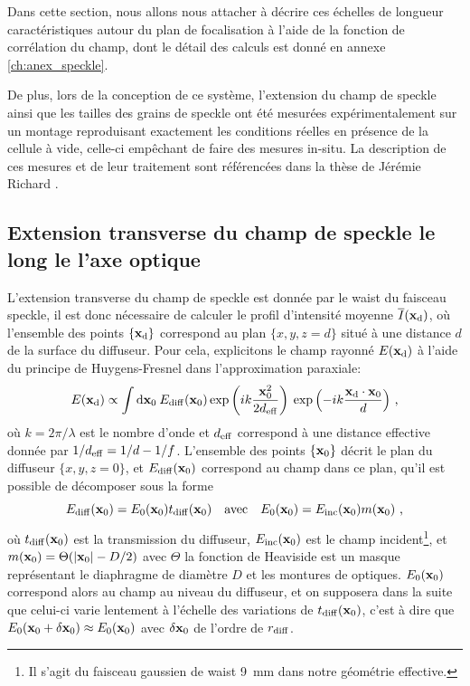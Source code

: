Dans cette section, nous allons nous attacher à décrire ces échelles de longueur caractéristiques autour du plan de focalisation à l'aide de la fonction de corrélation du champ, dont le détail des calculs est donné en annexe \ref{ch:anex_speckle}. 

De plus, lors de la conception de ce système, l'extension du champ de speckle ainsi que les tailles des grains de speckle ont été mesurées expérimentalement sur un montage reproduisant exactement les conditions réelles en présence de la cellule à vide, celle-ci empêchant de faire des mesures in-situ. La description de ces mesures et de leur traitement sont référencées dans la thèse de Jérémie Richard \citep{richard2015propagation}.




\subsection{Extension transverse du champ de speckle le long le l'axe optique}
L'extension transverse du champ de speckle est donnée par le waist du faisceau speckle, il est donc nécessaire de calculer le profil d'intensité moyenne $\overline{I}(\mathbf{x}_{\mathrm{d}})$, où l'ensemble des points $\lbrace\mathbf{x}_{\mathrm{d}}\rbrace$ correspond au plan $\lbrace x,y,z=d \rbrace$ situé à une distance $d$ de la surface du diffuseur. Pour cela, explicitons le champ rayonné $E(\mathbf{x}_{\mathrm{d}})$ à l'aide du principe de Huygens-Fresnel dans l'approximation paraxiale:
\begin{equation}
E(\mathbf{x}_{\mathrm{d}}) \propto \int{\mathrm{d}\mathbf{x}_0\: E_{\mathrm{diff}}(\mathbf{x}_0) \exp{\left( ik\frac{\mathbf{x}_0^2}{2d_{\mathrm{eff}}} \right) } \: \exp{\left( -ik \frac{\mathbf{x}_{\mathrm{d}}\cdot \mathbf{x}_0}{d} \right) } } \text{ ,}
\label{eq:amplitude_rayonnee}
\end{equation}
où $k=2\pi/\lambda$ est le nombre d'onde et $d_{\mathrm{eff}}$ correspond à une distance effective donnée par $1/d_{\mathrm{eff}}=1/d-1/f$. L'ensemble des points $\lbrace\mathbf{x}_0\rbrace$ décrit le plan du diffuseur $\lbrace x,y,z=0 \rbrace$, et $E_{\mathrm{diff}} (\mathbf{x}_0)$ correspond au champ dans ce plan, qu'il est possible de décomposer sous la forme 
\begin{equation}
E_{\mathrm{diff}}(\mathbf{x}_0)=E_0(\mathbf{x}_0) t_{\mathrm{diff}}(\mathbf{x}_0) \quad \text{avec} \quad E_0(\mathbf{x}_0) = E_\mathrm{inc} (\mathbf{x}_0) m(\mathbf{x}_0) \text{ ,}
\end{equation}
où $t_{\mathrm{diff}}(\mathbf{x}_0)$ est la transmission du diffuseur, $E_{\mathrm{inc}}(\mathbf{x}_0)$ est le champ incident\footnote{Il s'agit du faisceau gaussien de waist \SI{9}{\milli\metre} dans notre géométrie effective.}, et $m(\mathbf{x}_0)=\Theta(\left| \mathbf{x}_0 \right| - D/2)$ avec $\Theta$ la fonction de Heaviside est un masque représentant le diaphragme de diamètre $D$ et les montures de optiques. $E_0(\mathbf{x}_0)$ correspond alors au champ au niveau du diffuseur, et on supposera dans la suite que celui-ci varie lentement à l'échelle des variations de $t_{\mathrm{diff}}(\mathbf{x}_0)$, c'est à dire que $E_0(\mathbf{x}_0+\delta\mathbf{x}_0)\approx E_0(\mathbf{x}_0)$ avec $\delta\mathbf{x}_0$ de l'ordre de $r_{\mathrm{diff}}$.

